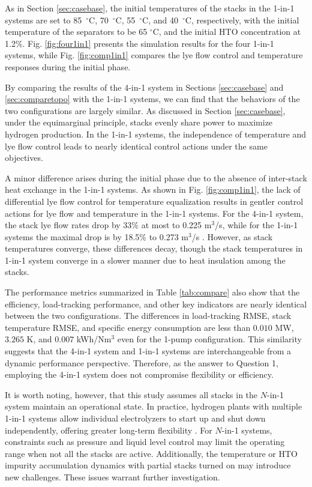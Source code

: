 \documentclass[review,3p,10pt]{elsarticle}
\begin{document}
As in Section \ref{sec:casebase}, the initial temperatures of the stacks in the 1-in-1 systems are set to 85~$^\circ$C, 70~$^\circ$C, 55~$^\circ$C, and 40~$^\circ$C, respectively, with the initial temperature of the separators to be 65 $^\circ$C, and the initial HTO concentration at 1.2\%. 
Fig. \ref{fig:four1in1} presents the simulation results for the four 1-in-1 systems, while Fig. \ref{fig:comp1in1} compares the lye flow control and temperature responses during the initial phase.

By comparing the results of the 4-in-1 system in Sections \ref{sec:casebase} and \ref{sec:comparetopo} with the 1-in-1 systems, we can find that the behaviors of the two configurations are largely similar. As discussed in Section \ref{sec:casebase}, under the equimarginal principle, stacks evenly share power to maximize hydrogen production. In the 1-in-1 systems, the independence of temperature and lye flow control leads to nearly identical control actions under the same objectives.

A minor difference arises during the initial phase due to the absence of inter-stack heat exchange in the 1-in-1 systems. As shown in Fig. \ref{fig:comp1in1}, the lack of differential lye flow control for temperature equalization results in gentler control actions for lye flow and temperature in the 1-in-1 systems. For the 4-in-1 system, the stack lye flow rates drop by 33\% at most to 0.225 m$^3$/s, while for the 1-in-1 systems the maximal drop is by 18.5\% to 0.273 m$^3$/s . However, as stack temperatures converge, these differences decay, though the stack temperatures in 1-in-1 system converge in a slower manner due to heat insulation among the stacks.

The performance metrics summarized in Table \ref{tab:compare} also show that the efficiency, load-tracking performance, and other key indicators are nearly identical between the two configurations. The differences in load-tracking RMSE, stack temperature RMSE, and specific energy consumption are less than $0.010$ MW, $3.265$ K, and $0.007$ kWh/Nm$^3$ even for the 1-pump configuration. This similarity suggests that the 4-in-1 system and 1-in-1 systems are interchangeable from a dynamic performance perspective. Therefore, as the answer to Question 1, employing the 4-in-1 system %
does not compromise flexibility or efficiency.

It is worth noting, however, that this study assumes all stacks in the $N$-in-1 system maintain an operational state. In practice, hydrogen plants with multiple 1-in-1 systems allow individual electrolyzers to start up and shut down independently, offering greater long-term flexibility \cite{varela2021modeling,qiu2023extended,li2024two}. For 
$N$-in-1 systems, constraints such as pressure and liquid level control may limit the operating range when not all the stacks are active. Additionally, the temperature or HTO impurity accumulation dynamics with partial stacks turned on may introduce new challenges. %
These issues warrant further investigation. 
\end{document}
